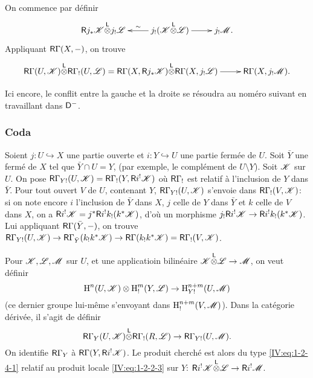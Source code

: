 On commence par d\'efinir 
\[\xymatrix{
  \R j_* \cK\lotimes j_! \cL 
    & \ar[l]_-\sim j_!(\cK\lotimes \cL) \ar[r] 
    & j_!\cM \text{.}
}\]
Appliquant $\mathsf{R}\Gamma(X,-)$, on trouve 
\[\xymatrix{
  \R\Gamma(U,\cK)\lotimes\R\Gamma_!(U,\cL) = \R\Gamma(X,\R j_*\cK)\lotimes \R\Gamma(X,j_!\cL) \ar[r] 
    & \R\Gamma(X,j_! \cM) \text{.}
}\]

Ici encore, le conflit entre la gauche et la droite se r\'esoudra au nom\'ero 
suivant en travaillant dans $\mathsf{D}^-$. 





\subsubsection{Coda}\label{IV:1-2-5}

Soient $j:U\hookrightarrow X$ une partie ouverte et $i:Y\hookrightarrow U$ une 
partie ferm\'ee de $U$. Soit $\bar Y$ une ferm\'e de $X$ tel que 
$\bar Y\cap U=Y$, (par exemple, le compl\'ement de $U\setminus Y$). Soit $\mathscr{K}$ 
sur $U$. On pose $\mathsf{R}\Gamma_{Y!}(U,\mathscr{K})=\mathsf{R}\Gamma_!(Y,\mathsf{R} i^!\mathscr{K})$ o\`u 
$\mathsf{R}\Gamma_!$ est relatif \`a l'inclusion de $Y$ dans $\bar Y$. Pour tout ouvert 
$V$ de $U$, contenant $Y$, $\mathsf{R}\Gamma_{Y!}(U,\mathscr{K})$ s'envoie dans 
$\mathsf{R}\Gamma_!(V,\mathscr{K})$: si on note encore $i$ l'inclusion de $\bar Y$ dans $X$, 
$j$ celle de $Y$ dans $\bar Y$ et $k$ celle de $V$ dans $X$, on a 
$\mathsf{R} i^!\mathscr{K} = j^*\mathsf{R} i^! k_!(k^*\mathscr{K})$, d'o\`u un morphisme 
$j_!\mathsf{R} i^!\mathscr{K} \to \mathsf{R} i^! k_!(k^*\mathscr{K})$. Lui appliquant 
$\mathsf{R}\Gamma(\bar Y,-)$, on trouve 
$\mathsf{R}\Gamma_{Y!}(U,\mathscr{K})\to \mathsf{R}\Gamma_{\bar Y}(k_! k^* \mathscr{K}) \to \mathsf{R}\Gamma(k_! k^*\mathscr{K}) = \mathsf{R}\Gamma_!(V,\mathscr{K})$. 

Pour $\mathscr{K},\mathscr{L},\mathscr{M}$ sur $U$, et une applicatioin bilin\'eaire 
$\mathscr{K}{\overset{\mathsf{L}}{\otimes}}\mathscr{L}\to\mathscr{M}$, on veut d\'efinir 
\begin{equation}\label{IV:eq:1-2-5-1-1}
  \operatorname{H}^n(U,\mathscr{K})\otimes \operatorname{H}_!^m(Y,\mathscr{L}) \to \operatorname{H}_{Y!}^{n+m}(U,\mathscr{M})
\end{equation}
(ce dernier groupe lui-m\^eme s'envoyant dans $\operatorname{H}_!^{n+m}(V,\mathscr{M})$). Dans la 
cat\'egorie d\'eriv\'ee, il s'agit de d\'efinir 
\begin{equation}\label{IV:eq:1-2-5-2}
  \mathsf{R}\Gamma_Y(U,\mathscr{K}) {\overset{\mathsf{L}}{\otimes}} \mathsf{R}\Gamma_!(R,\mathscr{L}) \to \mathsf{R}\Gamma_{Y!}(U,\mathscr{M}) \text{.}
\end{equation}
On identifie $\mathsf{R}\Gamma_Y$ \`a $\mathsf{R}\Gamma(Y,\mathsf{R} i^!\mathscr{K})$. Le produit cherch\'e 
est alors du type \eqref{IV:eq:1-2-4-1} relatif au produit locale 
\eqref{IV:eq:1-2-2-3} sur $Y$: $\mathsf{R} i^! \mathscr{K}{\overset{\mathsf{L}}{\otimes}}\mathscr{L} \to \mathsf{R} i^! \mathscr{M}$. 





